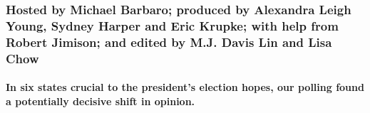 \hypertarget{hosted-by-michael-barbaro-produced-by-alexandra-leigh-young-sydney-harper-and-eric-krupke-with-help-from-robert-jimison-and-edited-by-mj-davis-lin-and-lisa-chow}{%
\subsubsection{Hosted by Michael Barbaro; produced by Alexandra Leigh
Young, Sydney Harper and Eric Krupke; with help from Robert Jimison; and
edited by M.J. Davis Lin and Lisa
Chow}\label{hosted-by-michael-barbaro-produced-by-alexandra-leigh-young-sydney-harper-and-eric-krupke-with-help-from-robert-jimison-and-edited-by-mj-davis-lin-and-lisa-chow}}

\hypertarget{in-six-states-crucial-to-the-presidents-election-hopes-our-polling-found-a-potentially-decisive-shift-in-opinion}{%
\paragraph{In six states crucial to the president's election hopes, our
polling found a potentially decisive shift in
opinion.}\label{in-six-states-crucial-to-the-presidents-election-hopes-our-polling-found-a-potentially-decisive-shift-in-opinion}}

